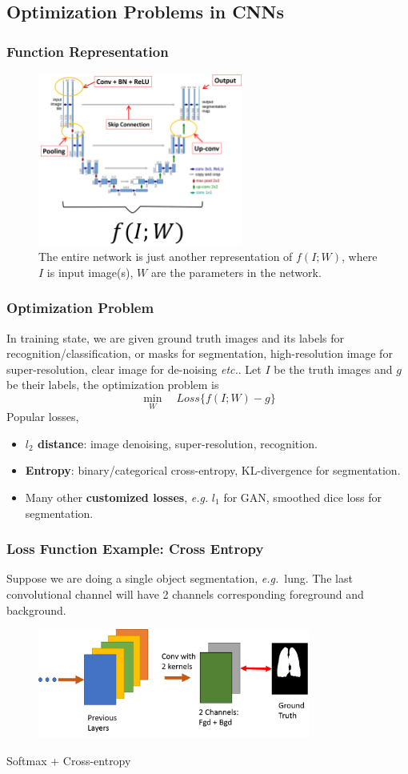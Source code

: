 \documentclass[10pt]{beamer}
\newcommand{\etc}{{\it etc.}}
\newcommand{\eg}{{\it e.g.}}
\begin{document}
\subsection{Optimization Problems in CNNs}
\begin{frame}
\frametitle{Function Representation}
	\begin{figure}[H]
	\centerline{
		\includegraphics[width=0.6\textwidth]{optimization_fx.png}
	}
	\caption{The entire network is just another representation of $f(I; W)$, where $I$ is input image(s), $W$ are the parameters in the network.}
	\end{figure}
\end{frame}

\begin{frame}
\frametitle{Optimization Problem}
In training state, we are given ground truth images and its labels for recognition/classification, or masks for segmentation, high-resolution image for super-resolution, clear image for de-noising \etc. 
\vskip 0.2in
Let $I$ be the truth images and $g$ be their labels, the optimization problem is 
\[
\min_W \quad Loss\{ f(I; W) - g\}
\] 
Popular losses,
\begin{itemize}
	\item \textbf{$l_2$ distance}: image denoising, super-resolution, recognition.
	\item \textbf{Entropy}: binary/categorical cross-entropy, KL-divergence for segmentation.
	\item Many other \textbf{customized losses}, \eg \text{ } $l_1$ for GAN, smoothed dice loss for segmentation.
\end{itemize}
\end{frame}

\begin{frame}
\frametitle{Loss Function Example: Cross Entropy}
Suppose we are doing a single object segmentation, \eg\ lung. The last convolutional channel will have 2 channels corresponding foreground and background. 
	\begin{figure}[H]
	\centerline{
		\includegraphics[width=0.8\textwidth]{last_layer.png}
	}
	\end{figure}
Softmax + Cross-entropy
\end{frame}
\end{document}

